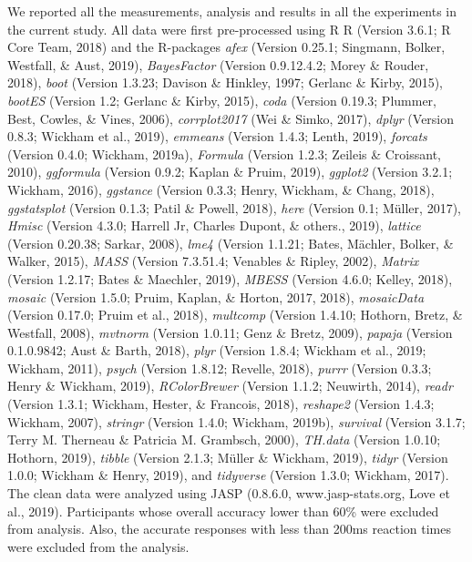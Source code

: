 \documentclass[man]{apa6}
\begin{document}
We reported all the measurements, analysis and results in all the experiments in the current study. All data were first pre-processed using R R (Version 3.6.1; R Core Team, 2018) and the R-packages \emph{afex} (Version 0.25.1; Singmann, Bolker, Westfall, \& Aust, 2019), \emph{BayesFactor} (Version 0.9.12.4.2; Morey \& Rouder, 2018), \emph{boot} (Version 1.3.23; Davison \& Hinkley, 1997; Gerlanc \& Kirby, 2015), \emph{bootES} (Version 1.2; Gerlanc \& Kirby, 2015), \emph{coda} (Version 0.19.3; Plummer, Best, Cowles, \& Vines, 2006), \emph{corrplot2017} (Wei \& Simko, 2017), \emph{dplyr} (Version 0.8.3; Wickham et al., 2019), \emph{emmeans} (Version 1.4.3; Lenth, 2019), \emph{forcats} (Version 0.4.0; Wickham, 2019a), \emph{Formula} (Version 1.2.3; Zeileis \& Croissant, 2010), \emph{ggformula} (Version 0.9.2; Kaplan \& Pruim, 2019), \emph{ggplot2} (Version 3.2.1; Wickham, 2016), \emph{ggstance} (Version 0.3.3; Henry, Wickham, \& Chang, 2018), \emph{ggstatsplot} (Version 0.1.3; Patil \& Powell, 2018), \emph{here} (Version 0.1; Müller, 2017), \emph{Hmisc} (Version 4.3.0; Harrell Jr, Charles Dupont, \& others., 2019), \emph{lattice} (Version 0.20.38; Sarkar, 2008), \emph{lme4} (Version 1.1.21; Bates, Mächler, Bolker, \& Walker, 2015), \emph{MASS} (Version 7.3.51.4; Venables \& Ripley, 2002), \emph{Matrix} (Version 1.2.17; Bates \& Maechler, 2019), \emph{MBESS} (Version 4.6.0; Kelley, 2018), \emph{mosaic} (Version 1.5.0; Pruim, Kaplan, \& Horton, 2017, 2018), \emph{mosaicData} (Version 0.17.0; Pruim et al., 2018), \emph{multcomp} (Version 1.4.10; Hothorn, Bretz, \& Westfall, 2008), \emph{mvtnorm} (Version 1.0.11; Genz \& Bretz, 2009), \emph{papaja} (Version 0.1.0.9842; Aust \& Barth, 2018), \emph{plyr} (Version 1.8.4; Wickham et al., 2019; Wickham, 2011), \emph{psych} (Version 1.8.12; Revelle, 2018), \emph{purrr} (Version 0.3.3; Henry \& Wickham, 2019), \emph{RColorBrewer} (Version 1.1.2; Neuwirth, 2014), \emph{readr} (Version 1.3.1; Wickham, Hester, \& Francois, 2018), \emph{reshape2} (Version 1.4.3; Wickham, 2007), \emph{stringr} (Version 1.4.0; Wickham, 2019b), \emph{survival} (Version 3.1.7; Terry M. Therneau \& Patricia M. Grambsch, 2000), \emph{TH.data} (Version 1.0.10; Hothorn, 2019), \emph{tibble} (Version 2.1.3; Müller \& Wickham, 2019), \emph{tidyr} (Version 1.0.0; Wickham \& Henry, 2019), and \emph{tidyverse} (Version 1.3.0; Wickham, 2017). The clean data were analyzed using JASP (0.8.6.0, www.jasp-stats.org, Love et al., 2019). Participants whose overall accuracy lower than 60\% were excluded from analysis. Also, the accurate responses with less than 200ms reaction times were excluded from the analysis.
\end{document}
